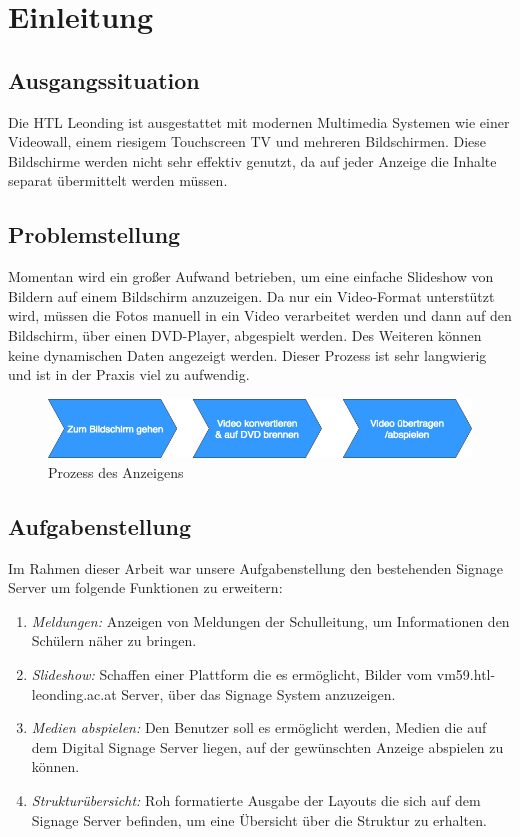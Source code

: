 \chapter{Einleitung}
\section{Ausgangssituation}
Die HTL Leonding ist ausgestattet mit modernen Multimedia Systemen wie einer Videowall, einem riesigem Touchscreen TV und mehreren Bildschirmen. Diese Bildschirme werden nicht sehr effektiv genutzt, da auf jeder Anzeige die Inhalte separat übermittelt werden müssen. 

\section{Problemstellung}
Momentan wird ein großer Aufwand betrieben, um eine einfache Slideshow von Bildern auf einem Bildschirm anzuzeigen. Da nur ein Video-Format unterstützt wird, müssen die Fotos manuell in ein Video verarbeitet werden und dann auf den Bildschirm, über einen DVD-Player, abgespielt werden. Des Weiteren können keine dynamischen Daten angezeigt werden. Dieser Prozess ist sehr langwierig und ist in der Praxis viel zu aufwendig.

\begin{figure}[h]
\centering
\includegraphics[width=1\textwidth]{images/01_Introduction/WayToDisplay.png}
\caption{Prozess des Anzeigens}
\label{img:processofshow}
\end{figure}

\section{Aufgabenstellung}
Im Rahmen dieser Arbeit war unsere Aufgabenstellung den bestehenden Signage Server um folgende Funktionen zu erweitern:

\begin{enumerate}
	\item {\em Meldungen:} Anzeigen von Meldungen der Schulleitung, um Informationen den Schülern näher zu bringen. 
	\item {\em Slideshow:} Schaffen einer Plattform die es ermöglicht, Bilder vom vm59.htl-leonding.ac.at Server, über das Signage System anzuzeigen.
	\item {\em Medien abspielen:} Den Benutzer soll es ermöglicht werden, Medien die auf dem Digital Signage Server liegen, auf der gewünschten Anzeige abspielen zu können.
	\item {\em Strukturübersicht:} Roh formatierte Ausgabe der Layouts die sich auf dem Signage Server befinden, um eine Übersicht über die Struktur zu erhalten.	
\end{enumerate}

